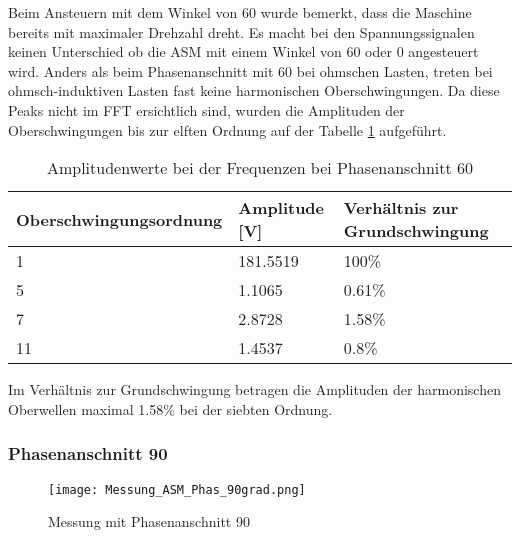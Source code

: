 Beim Ansteuern mit dem Winkel von 60\textdegree \hspace{0.02cm} wurde bemerkt, dass die Maschine bereits mit maximaler Drehzahl dreht. Es macht bei den Spannungssignalen keinen Unterschied ob die ASM mit einem Winkel von 60\textdegree \hspace{0.02cm} oder 0\textdegree \hspace{0.02cm} angesteuert wird.
Anders als beim Phasenanschnitt mit 60\textdegree\hspace{0.02cm} bei ohmschen Lasten, treten bei ohmsch-induktiven Lasten fast keine harmonischen Oberschwingungen. Da diese Peaks nicht im FFT ersichtlich sind, wurden die Amplituden der Oberschwingungen bis zur elften Ordnung auf der Tabelle \ref{tab:Mess_Spannung_ASM_Phas60} aufgeführt. 
\newpage
\begin{table}[ht!]
	\centering
	\begin{tabular}{|l|l|l|}
		\hline
		Oberschwingungsordnung & Amplitude {[}V{]} & Verhältnis zur Grundschwingung \\ \hline
		1                      & 181.5519          & 100\%                          \\ \hline
		5                      & 1.1065            & 0.61\%                         \\ \hline
		7                      & 2.8728            & 1.58\%                         \\ \hline
		11                     & 1.4537            & 0.8\%                          \\ \hline
	\end{tabular}
\caption{Amplitudenwerte bei der Frequenzen bei Phasenanschnitt 60\textdegree}\label{tab:Mess_Spannung_ASM_Phas60}
\end{table}

Im Verhältnis zur Grundschwingung betragen die Amplituden der harmonischen Oberwellen maximal 1.58\% bei der siebten Ordnung. 

\newpage
\subsubsection*{Phasenanschnitt 90\textdegree}
\begin{figure}[ht!]
	\centering
	\texttt{[image: Messung\_ASM\_Phas\_90grad.png]}	
	\caption{Messung mit Phasenanschnitt 90\textdegree}\label{fig:Mess_ASM_Phas90}
\end{figure}

